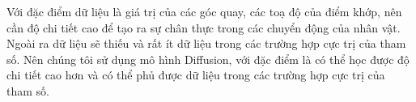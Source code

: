 

Với đặc điểm dữ liệu là giá trị của các góc quay, các toạ độ của điểm khớp, nên cần độ chi tiết cao để tạo ra sự chân thực trong các chuyển động của nhân vật. Ngoài ra dữ liệu sẽ thiếu và rất ít dữ liệu trong các trường hợp cực trị của tham số.
Nên chúng tôi sử dụng mô hình Diffusion, với đặc điểm là có thể học được độ chi tiết cao hơn và có thể phủ được dữ liệu trong các trường hợp cực trị của tham số.

%
%


